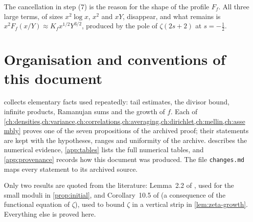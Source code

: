 The cancellation in step (7) is the reason for the shape of the profile $F_f$. All three large terms, of sizes $x^2\log x$, $x^2$ and $xY$, disappear, and what remains is $x^2F_f(x/Y)\approx K_fx^{1/2}Y^{3/2}$, produced by the pole of $\zeta(2s+2)$ at $s=-\frac12$.

\section{Organisation and conventions of this document}

 collects elementary facts used repeatedly: tail estimates, the divisor bound, infinite products, Ramanujan sums and the growth of $f$. Each of \cref{ch:densities,ch:variance,ch:correlations,ch:averaging,ch:dirichlet,ch:mellin,ch:assembly} proves one of the seven propositions of the archived proof; their statements are kept with the hypotheses, ranges and uniformity of the archive.  describes the numerical evidence, \cref{app:tables} lists the full numerical tables, and \cref{app:provenance} records how this document was produced. The file \texttt{changes.md} maps every statement to its archived source.

Only two results are quoted from the literature: Lemma~2.2 of \cite{bgpvw1998}, used for the small moduli in \cref{prop:initial}, and Corollary~10.5 of \cite{montgomeryvaughan2007} (a consequence of the functional equation of $\zeta$), used to bound $\zeta$ in a vertical strip in \cref{lem:zeta-growth}. Everything else is proved here.
